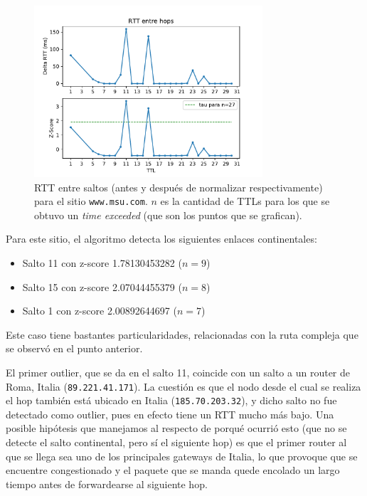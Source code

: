 \begin{figure}[H]
  \centering
  \includegraphics[width=8.5cm]{figs/traceroute-moscow.pdf}
  \caption{\footnotesize RTT entre saltos (antes y después de normalizar respectivamente) para el sitio \texttt{www.msu.com}. $n$ es la cantidad de TTLs para los que se obtuvo un \emph{time exceeded} (que son los puntos que se grafican).}
  \label{plot-moscow}
\end{figure}

Para este sitio, el algoritmo detecta los siguientes enlaces continentales:
\begin{itemize}
  \item Salto 11 con z-score 1.78130453282 ($n=9$)
  \item Salto 15 con z-score 2.07044455379 ($n=8$)
  \item Salto 1 con z-score 2.00892644697 ($n=7$)
\end{itemize}

Este caso tiene bastantes particularidades, relacionadas con la ruta compleja que se observó en el punto anterior. 

El primer outlier, que se da en el salto 11, coincide con un salto a un router de Roma, Italia (\texttt{89.221.41.171}). La cuestión es que el nodo desde el cual se realiza el hop también está ubicado en Italia (\texttt{185.70.203.32}), y dicho salto no fue detectado como outlier, pues en efecto tiene un RTT mucho más bajo. Una posible hipótesis que manejamos al respecto de porqué ocurrió esto (que no se detecte el salto continental, pero sí el siguiente hop) es que el primer router al que se llega sea uno de los principales gateways de Italia, lo que provoque que se encuentre congestionado y el paquete que se manda quede encolado un largo tiempo antes de forwardearse al siguiente hop. 

